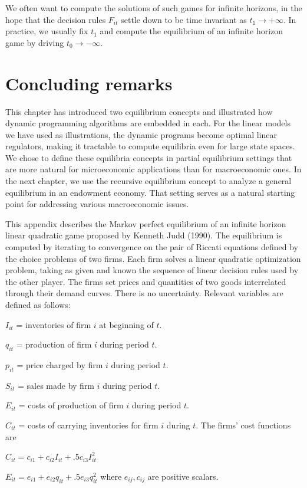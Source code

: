  We often want to compute the solutions of such  games for
infinite horizons, in the hope that the decision rules
$F_{it}$ settle down to be time invariant as $t_1 \rightarrow +\infty$.
In practice, we usually  fix $t_1$ and compute the equilibrium
of an infinite horizon game by driving $t_0 \rightarrow - \infty$.



\section{Concluding remarks}

  This chapter has introduced two
equilibrium concepts and illustrated how dynamic programming
algorithms are embedded in each.   For the linear models we have
used as illustrations,  the dynamic programs become optimal
linear regulators, making it tractable to compute equilibria
even for large state spaces.
We chose to define these equilibria concepts in
partial equilibrium settings
that are more natural for microeconomic applications than for
macroeconomic ones.  In the next chapter, we
use the recursive equilibrium concept to analyze
a general equilibrium in an endowment economy. That setting
serves as a natural starting point for addressing various
macroeconomic issues.



\label{appaJudd}%
This appendix describes the Markov perfect equilibrium of an
infinite horizon linear quadratic game proposed
by Kenneth Judd (1990).
%
%
  The equilibrium is computed by iterating to convergence on the
pair of Riccati equations defined by the choice problems of
two firms.
  Each firm solves a linear quadratic optimization
problem, taking as given and known the sequence of linear decision rules
used by the other player.  The firms set prices and quantities of two
goods interrelated through their demand curves.
  There is no uncertainty.  Relevant variables are defined
as follows:
\smallskip
\item{} $I_{it}$ = inventories of firm $i$ at beginning of $t$.
\item{} $q_{it}$ = production of firm $i$ during period $t$.
\item{} $p_{it}$ = price charged by firm $i$ during period $t$.
\item{} $S_{it}$ = sales made by firm $i$ during period $t$.
\item{} $E_{it}$ = costs of production of firm $i$ during period $t$.
\item{}  $C_{it}$ = costs of carrying inventories for firm $i$ during $t$.
\medskip
\noindent The firms' cost functions are
\smallskip
\item{} $C_{it} = c_{i1} + c_{i2} I_{it} + .5 c_{i3} I_{it}^2$
\item{} $E_{it} = e_{i1} + e_{i2}q_{it} + .5 e_{i3} q_{it}^2$
\smallskip
\noindent where $e_{ij},c_{ij}$ are positive scalars.

